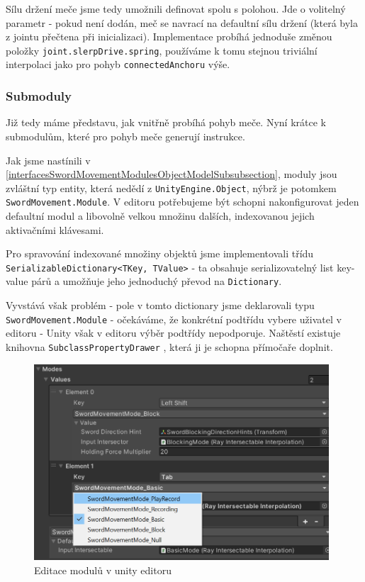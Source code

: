 Sílu držení meče jsme tedy umožnili definovat spolu s polohou. Jde o volitelný parametr - pokud není dodán, meč se navrací na defaultní sílu držení (která byla z jointu přečtena při inicializaci). Implementace probíhá jednoduše změnou položky \texttt{joint.slerpDrive.spring}, používáme k tomu stejnou triviální interpolaci jako pro pohyb \texttt{connectedAnchoru} výše.

\subsubsection*{Submoduly} \label{implementationSwordSubmodulesSubsubsection}

Již tedy máme představu, jak vnitřně probíhá pohyb meče. Nyní krátce k submodulům, které pro pohyb meče generují instrukce. 

Jak jsme nastínili v \ref{interfacesSwordMovementModulesObjectModelSubsubsection}, moduly jsou zvláštní typ entity, která nedědí z \texttt{UnityEngine.Object}, nýbrž je potomkem \texttt{SwordMovement.Module}. V editoru potřebujeme být schopni nakonfigurovat jeden defaultní modul a libovolně velkou množinu dalších, indexovanou jejich aktivačními klávesami.

Pro spravování indexované množiny objektů jsme implementovali třídu \texttt{SerializableDictionary<TKey, TValue>} - ta obsahuje serializovatelný list key-value párů a umožňuje jeho jednoduchý převod na \texttt{Dictionary}. 

Vyvstává však problém - pole v tomto dictionary jsme deklarovali typu \texttt{SwordMovement.Module} - očekáváme, že konkrétní podtřídu vybere uživatel v editoru - Unity však v editoru výběr podtřídy nepodporuje. Naštěstí existuje knihovna \texttt{SubclassPropertyDrawer} \cite{SubclassPropertyDrawer}, která ji je schopna přímočaře doplnit.  

\begin{figure}[ht]\centering
  \center
  \includegraphics[width=110mm]{../img/swordMovementModulesEditor.png}
  \caption{Editace modulů v unity editoru}
  \label{obr05:swordModulePicker}
\end{figure} 

